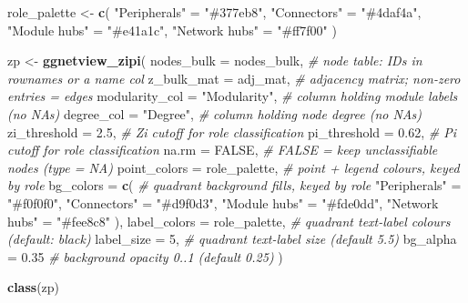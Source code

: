 \documentclass[
]{book}
\newenvironment{Shaded}{\begin{snugshade}}{\end{snugshade}}
\newcommand{\AttributeTok}[1]{\textcolor[rgb]{0.13,0.29,0.53}{#1}}
\newcommand{\CommentTok}[1]{\textcolor[rgb]{0.56,0.35,0.01}{\textit{#1}}}
\newcommand{\ConstantTok}[1]{\textcolor[rgb]{0.56,0.35,0.01}{#1}}
\newcommand{\DecValTok}[1]{\textcolor[rgb]{0.00,0.00,0.81}{#1}}
\newcommand{\FloatTok}[1]{\textcolor[rgb]{0.00,0.00,0.81}{#1}}
\newcommand{\FunctionTok}[1]{\textcolor[rgb]{0.13,0.29,0.53}{\textbf{#1}}}
\newcommand{\NormalTok}[1]{#1}
\newcommand{\OtherTok}[1]{\textcolor[rgb]{0.56,0.35,0.01}{#1}}
\newcommand{\StringTok}[1]{\textcolor[rgb]{0.31,0.60,0.02}{#1}}
\begin{document}
\begin{Shaded}
\begin{Highlighting}[]
\NormalTok{role\_palette }\OtherTok{\textless{}{-}} \FunctionTok{c}\NormalTok{(}
  \StringTok{"Peripherals"}  \OtherTok{=} \StringTok{"\#377eb8"}\NormalTok{,}
  \StringTok{"Connectors"}   \OtherTok{=} \StringTok{"\#4daf4a"}\NormalTok{,}
  \StringTok{"Module hubs"}  \OtherTok{=} \StringTok{"\#e41a1c"}\NormalTok{,}
  \StringTok{"Network hubs"} \OtherTok{=} \StringTok{"\#ff7f00"}
\NormalTok{)}

\NormalTok{zp }\OtherTok{\textless{}{-}} \FunctionTok{ggnetview\_zipi}\NormalTok{(}
  \AttributeTok{nodes\_bulk     =}\NormalTok{ nodes\_bulk,    }\CommentTok{\# node table: IDs in rownames or a \textasciigrave{}name\textasciigrave{} col}
  \AttributeTok{z\_bulk\_mat     =}\NormalTok{ adj\_mat,       }\CommentTok{\# adjacency matrix; non{-}zero entries = edges}
  \AttributeTok{modularity\_col =} \StringTok{"Modularity"}\NormalTok{,  }\CommentTok{\# column holding module labels (no NAs)}
  \AttributeTok{degree\_col     =} \StringTok{"Degree"}\NormalTok{,      }\CommentTok{\# column holding node degree   (no NAs)}
  \AttributeTok{zi\_threshold   =} \FloatTok{2.5}\NormalTok{,           }\CommentTok{\# Zi cutoff for role classification}
  \AttributeTok{pi\_threshold   =} \FloatTok{0.62}\NormalTok{,          }\CommentTok{\# Pi cutoff for role classification}
  \AttributeTok{na.rm          =} \ConstantTok{FALSE}\NormalTok{,         }\CommentTok{\# FALSE = keep unclassifiable nodes (type = NA)}
  \AttributeTok{point\_colors   =}\NormalTok{ role\_palette,  }\CommentTok{\# point + legend colours, keyed by role}
  \AttributeTok{bg\_colors      =} \FunctionTok{c}\NormalTok{(             }\CommentTok{\# quadrant background fills, keyed by role}
    \StringTok{"Peripherals"}  \OtherTok{=} \StringTok{"\#f0f0f0"}\NormalTok{,}
    \StringTok{"Connectors"}   \OtherTok{=} \StringTok{"\#d9f0d3"}\NormalTok{,}
    \StringTok{"Module hubs"}  \OtherTok{=} \StringTok{"\#fde0dd"}\NormalTok{,}
    \StringTok{"Network hubs"} \OtherTok{=} \StringTok{"\#fee8c8"}
\NormalTok{  ),}
  \AttributeTok{label\_colors   =}\NormalTok{ role\_palette,  }\CommentTok{\# quadrant text{-}label colours (default: black)}
  \AttributeTok{label\_size     =} \DecValTok{5}\NormalTok{,             }\CommentTok{\# quadrant text{-}label size  (default 5.5)}
  \AttributeTok{bg\_alpha       =} \FloatTok{0.35}           \CommentTok{\# background opacity 0..1    (default 0.25)}
\NormalTok{)}


\FunctionTok{class}\NormalTok{(zp)}
\end{Highlighting}
\end{Shaded}
\end{document}
